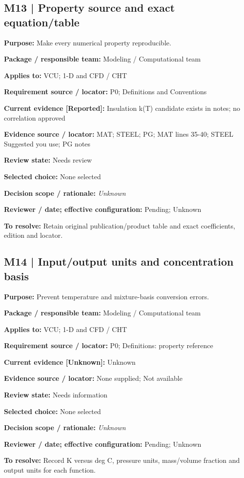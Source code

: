 \documentclass[11pt]{article}
\begin{document}
\begin{minipage}{\textwidth}\small\setlength{\parskip}{2pt}
\subsection*{M13 | Property source and exact equation/table}
\textbf{Purpose:} Make every numerical property reproducible.\par
\textbf{Package / responsible team:} Modeling / Computational team\par
\textbf{Applies to:} VCU; 1-D and CFD / CHT\par
\textbf{Requirement source / locator:} P0; Definitions and Conventions\par
\textbf{Current evidence [Reported]:} Insulation k(T) candidate exists in notes; no correlation approved\par
\textbf{Evidence source / locator:} MAT; STEEL; PG; MAT lines 35-40; STEEL Suggested you use; PG notes\par
\textbf{Review state:} Needs review\par
\textbf{Selected choice:} None selected\par
\textbf{Decision scope / rationale:} \textit{Unknown}\par
\textbf{Reviewer / date; effective configuration:} Pending; Unknown\par
\textbf{To resolve:} Retain original publication/product table and exact coefficients, edition and locator.\par
\end{minipage}\par\vspace{5pt}
\begin{minipage}{\textwidth}\small\setlength{\parskip}{2pt}
\subsection*{M14 | Input/output units and concentration basis}
\textbf{Purpose:} Prevent temperature and mixture-basis conversion errors.\par
\textbf{Package / responsible team:} Modeling / Computational team\par
\textbf{Applies to:} VCU; 1-D and CFD / CHT\par
\textbf{Requirement source / locator:} P0; Definitions: property reference\par
\textbf{Current evidence [Unknown]:} Unknown\par
\textbf{Evidence source / locator:} None supplied; Not available\par
\textbf{Review state:} Needs information\par
\textbf{Selected choice:} None selected\par
\textbf{Decision scope / rationale:} \textit{Unknown}\par
\textbf{Reviewer / date; effective configuration:} Pending; Unknown\par
\textbf{To resolve:} Record K versus deg C, pressure units, mass/volume fraction and output units for each function.\par
\end{minipage}\par\vspace{5pt}
\end{document}
